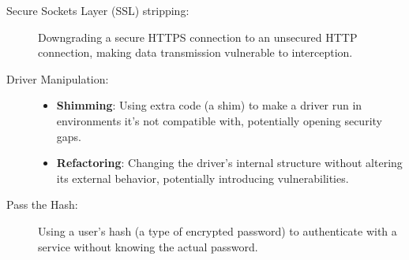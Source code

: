 \begin{fullwidth}
\begin{description}
        \item[Secure Sockets Layer (SSL) stripping:] Downgrading a secure HTTPS connection to an unsecured HTTP connection, making data transmission vulnerable to interception.
        \item[Driver Manipulation:] 
        \begin{itemize}
            \item \textbf{Shimming}: Using extra code (a shim) to make a driver run in environments it’s not compatible with, potentially opening security gaps.
            \item \textbf{Refactoring}: Changing the driver’s internal structure without altering its external behavior, potentially introducing vulnerabilities.
        \end{itemize}
        \item[Pass the Hash:] Using a user’s hash (a type of encrypted password) to authenticate with a service without knowing the actual password.
        
    \end{description}
    
\end{fullwidth}
\newpage